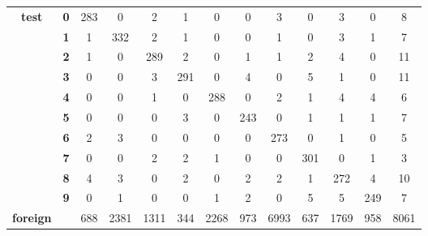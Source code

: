 \begin{table}[htp]
{\begin{tabular}{|c|c|c|c|c|c|c|c|c|c|c|c|c|}
		\multirow{10}{*}{\textbf{test}}     & \textbf{0} & 283        & 0          & 2          & 1          & 0          & 0          & 3          & 0          & 3          & 0          & 8                \\ \cline{2-13} 
		& \textbf{1} & 1          & 332        & 2          & 1          & 0          & 0          & 1          & 0          & 3          & 1          & 7                \\ \cline{2-13} 
		& \textbf{2} & 1          & 0          & 289        & 2          & 0          & 1          & 1          & 2          & 4          & 0          & 11               \\ \cline{2-13} 
		& \textbf{3} & 0          & 0          & 3          & 291        & 0          & 4          & 0          & 5          & 1          & 0          & 11               \\ \cline{2-13} 
		& \textbf{4} & 0          & 0          & 1          & 0          & 288        & 0          & 2          & 1          & 4          & 4          & 6                \\ \cline{2-13} 
		& \textbf{5} & 0          & 0          & 0          & 3          & 0          & 243        & 0          & 1          & 1          & 1          & 7                \\ \cline{2-13} 
		& \textbf{6} & 2          & 3          & 0          & 0          & 0          & 0          & 273        & 0          & 1          & 0          & 5                \\ \cline{2-13} 
		& \textbf{7} & 0          & 0          & 2          & 2          & 1          & 0          & 0          & 301        & 0          & 1          & 3                \\ \cline{2-13} 
		& \textbf{8} & 4          & 3          & 0          & 2          & 0          & 2          & 2          & 1          & 272        & 4          & 10               \\ \cline{2-13} 
		& \textbf{9} & 0          & 1          & 0          & 0          & 1          & 2          & 0          & 5          & 5          & 249        & 7                \\ \hline
		\textbf{foreign}                    & \textbf{}  & 688        & 2381       & 1311       & 344        & 2268       & 973        & 6993       & 637        & 1769       & 958        & 8061             \\ \hline
	\end{tabular}
	}
\end{table}

